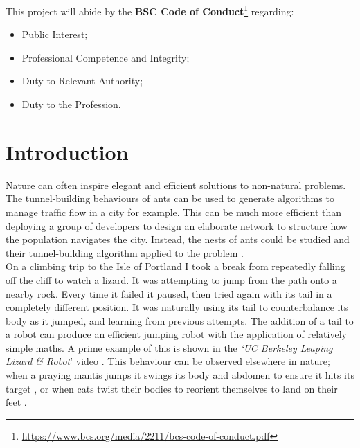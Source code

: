 \documentclass{article}
\begin{document}
This project will abide by the \textbf{BSC Code of Conduct}\footnote{\url{https://www.bcs.org/media/2211/bcs-code-of-conduct.pdf}} regarding:
\begin{itemize}
 \item Public Interest;
 \item Professional Competence and Integrity;
 \item Duty to Relevant Authority;
 \item Duty to the Profession.
 \end{itemize}

\makeatletter
\renewcommand\footnoterule{\kern-3\p@\hrule\@width\ifodd\value{page}6in\else6in\fi\kern2.6\p@}
\makeatother 

\newpage
\pagestyle{fancy}
\fancyhf{}
\tableofcontents

\newpage
\section{Introduction}
\label{sec:Introduction}
Nature can often inspire elegant and efficient solutions to non-natural problems. The tunnel-building behaviours of ants can be used to generate algorithms to manage traffic flow in a city for example. This can be much more efficient than deploying a group of developers to design an elaborate network to structure how the population navigates the city. Instead, the nests of ants could be studied and their tunnel-building algorithm applied to the problem . \\

On a climbing trip to the Isle of Portland I took a break from repeatedly falling off the cliff to watch a lizard. It was attempting to jump from the path onto a nearby rock. Every time it failed it paused, then tried again with its tail in a completely different position. It was naturally using its tail to counterbalance its body as it jumped, and learning from previous attempts. The addition of a tail to a robot can produce an efficient jumping robot with the application of relatively simple maths. A prime example of this is shown in the \textit{‘UC Berkeley Leaping Lizard \& Robot}’ video . This behaviour can be observed elsewhere in nature; when a praying mantis jumps it swings its body and abdomen to ensure it hits its target ,  or when cats twist their bodies to reorient themselves to land on their feet .\\
\end{document}
